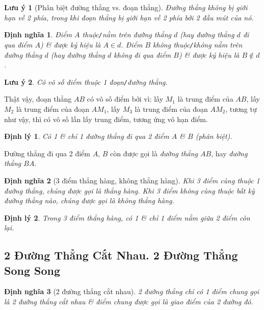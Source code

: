 \documentclass{article}
\numberwithin{equation}{section}
\newtheorem{definition}{Định nghĩa}[section]
\newtheorem{theorem}{Định lý}[section]
\newtheorem{remark}{Lưu ý}[section]
\begin{document}
\begin{remark}[Phân biệt đường thẳng vs. đoạn thẳng]
	Đường thẳng không bị giới hạn về 2 phía, trong khi đoạn thẳng bị giới hạn về 2 phía bởi 2 đầu mút của nó.
\end{remark}

\begin{definition}
	Điểm $A$ \emph{thuộc\texttt{/}nằm trên} đường thẳng $d$ (hay đường thẳng $d$ \emph{đi qua} điểm $A$) \& được ký hiệu là $A\in d$. Điểm $B$ \emph{không thuộc\texttt{/}không nằm trên} đường thẳng $d$ (hay đường thẳng $d$ \emph{không đi qua} điểm $B$) \& được ký hiệu là $B\notin d$.
\end{definition}

\begin{remark}
	Có vô số điểm thuộc 1 đoạn\texttt{/}đường thẳng.
\end{remark}
Thật vậy, đoạn thẳng $AB$ có vô số điểm bởi vì: lấy $M_1$ là trung điểm của $AB$, lấy $M_2$ là trung điểm của đoạn $AM_1$, lấy $M_3$ là trung điểm của đoạn $AM_2$, tương tự như vậy, thì có vô số lần lấy trung điểm, tương ứng vô hạn điểm.

\begin{theorem}
	Có 1 \& chỉ 1 đường thẳng đi qua 2 điểm $A$ \& $B$ (phân biệt).
\end{theorem}
Đường thẳng đi qua 2 điểm $A$, $B$ còn được gọi là \emph{đường thẳng $AB$}, hay \emph{đường thẳng $BA$}.

\begin{definition}[3 điểm thẳng hàng, không thẳng hàng]
	Khi 3 điểm cùng thuộc 1 đường thẳng, chúng được gọi là \emph{thẳng hàng}. Khi 3 điểm không cùng thuộc bất kỳ đường thẳng nào, chúng được gọi là \emph{không thẳng hàng}.
\end{definition}

\begin{theorem}
	Trong 3 điểm thẳng hàng, có 1 \& chỉ 1 điểm nằm giữa 2 điểm còn lại.
\end{theorem}

\subsection{2 Đường Thẳng Cắt Nhau. 2 Đường Thẳng Song Song}
\begin{definition}[2 đường thẳng cắt nhau]
	2 đường thẳng chỉ có 1 điểm chung gọi là \emph{2 đường thẳng cắt nhau} \& điểm chung được gọi là \emph{giao điểm} của 2 đường đó.
\end{definition}
\end{document}
